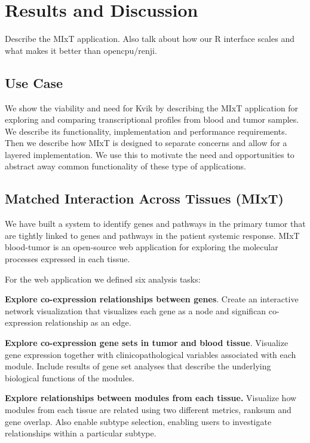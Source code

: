 
\section*{Results and Discussion}
Describe the MIxT application. Also talk about how our R interface scales and
what makes it better than opencpu/renji.


\subsection*{Use Case}
We show the viability and need for Kvik by describing the MIxT application for
exploring and comparing transcriptional profiles from blood and tumor samples.
We describe its functionality, implementation 
and performance requirements.
Then we describe how MIxT
is designed to separate concerns and allow for a layered implementation. We use
this to motivate the need and opportunities to abstract away common
functionality of these type of applications.

\subsection*{Matched Interaction Across Tissues (MIxT)}
We have built a system to identify genes and pathways in the primary tumor that
are tightly linked to genes and pathways in the patient systemic
response\cite{dumeaux2017}. MIxT blood-tumor is an open-source web application
for exploring the molecular processes expressed in each tissue. 

For the web application we defined six analysis tasks: 

\textbf{Explore co-expression relationships between genes}. Create an
interactive network visualization that visualizes each gene as a node and
significan co-expression relationship as an edge. 

\textbf{Explore co-expression gene sets in tumor and blood tissue}.
Visualize gene expression together with clinicopathological variables associated
with each module. Include results of gene set analyses that describe the
underlying biological functions of the modules. 

\textbf{Explore relationships between modules from each tissue.}
Visualize how modules from each tissue are related using two different
metrics, ranksum and gene overlap. Also enable subtype selection,
enabling users to investigate relationships within a particular subtype. 


